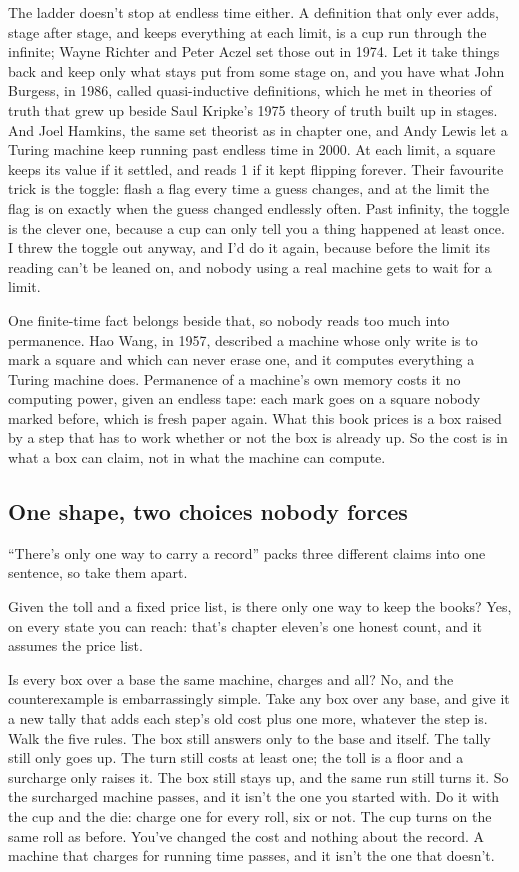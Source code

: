 \documentclass[11pt,twoside]{article}
\theoremstyle{thielethm}
\theoremstyle{thieledef}
\theoremstyle{thieledef}
\theoremstyle{thieledef}
\theoremstyle{thielethm}
\theoremstyle{thieleobs}
\theoremstyle{thielethm}
\begin{document}
The ladder doesn't stop at endless time either. A definition that only ever adds, stage after stage, and keeps everything at each limit, is a cup run through the infinite; Wayne Richter and Peter Aczel set those out in 1974. Let it take things back and keep only what stays put from some stage on, and you have what John Burgess, in 1986, called quasi-inductive definitions, which he met in theories of truth that grew up beside Saul Kripke's 1975 theory of truth built up in stages. And Joel Hamkins, the same set theorist as in chapter one, and Andy Lewis let a Turing machine keep running past endless time in 2000. At each limit, a square keeps its value if it settled, and reads 1 if it kept flipping forever. Their favourite trick is the toggle: flash a flag every time a guess changes, and at the limit the flag is on exactly when the guess changed endlessly often. Past infinity, the toggle is the clever one, because a cup can only tell you a thing happened at least once. I threw the toggle out anyway, and I'd do it again, because before the limit its reading can't be leaned on, and nobody using a real machine gets to wait for a limit.

One finite-time fact belongs beside that, so nobody reads too much into permanence. Hao Wang, in 1957, described a machine whose only write is to mark a square and which can never erase one, and it computes everything a Turing machine does. Permanence of a machine's own memory costs it no computing power, given an endless tape: each mark goes on a square nobody marked before, which is fresh paper again. What this book prices is a box raised by a step that has to work whether or not the box is already up. So the cost is in what a box can claim, not in what the machine can compute.

\subsection{One shape, two choices nobody forces}

``There's only one way to carry a record'' packs three different claims into one sentence, so take them apart.

Given the toll and a fixed price list, is there only one way to keep the books? Yes, on every state you can reach: that's chapter eleven's one honest count, and it assumes the price list.

Is every box over a base the same machine, charges and all? No, and the counterexample is embarrassingly simple. Take any box over any base, and give it a new tally that adds each step's old cost plus one more, whatever the step is. Walk the five rules. The box still answers only to the base and itself. The tally still only goes up. The turn still costs at least one; the toll is a floor and a surcharge only raises it. The box still stays up, and the same run still turns it. So the surcharged machine passes, and it isn't the one you started with. Do it with the cup and the die: charge one for every roll, six or not. The cup turns on the same roll as before. You've changed the cost and nothing about the record. A machine that charges for running time passes, and it isn't the one that doesn't.
\end{document}
